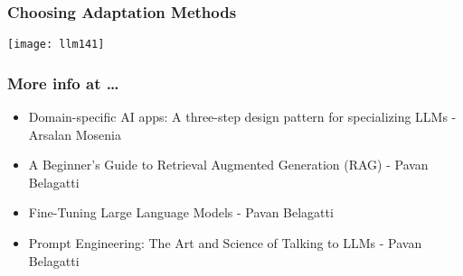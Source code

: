 \begin{frame}[fragile]\frametitle{Choosing Adaptation Methods}

\begin{center}
\texttt{[image: llm141]}
\end{center}				

\end{frame}

\begin{frame}[fragile]\frametitle{More info at \ldots}
  \begin{itemize}
    \item Domain-specific AI apps: A three-step design pattern for specializing LLMs - Arsalan Mosenia
	\item A Beginner's Guide to Retrieval Augmented Generation (RAG) - Pavan Belagatti
	\item Fine-Tuning Large Language Models - Pavan Belagatti
	\item Prompt Engineering: The Art and Science of Talking to LLMs - Pavan Belagatti
  \end{itemize}
\end{frame}